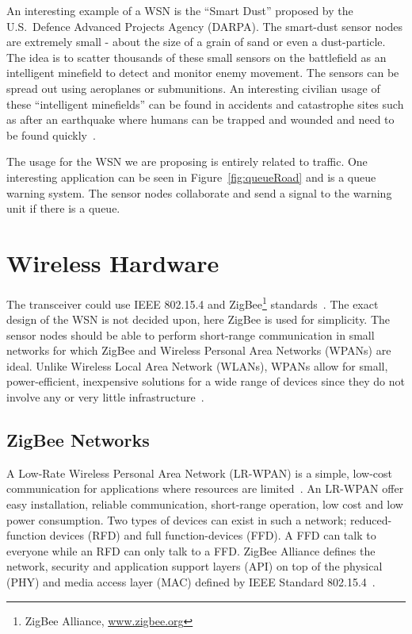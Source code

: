 An interesting example of a WSN is the ``Smart Dust'' proposed by the U.S.~Defence Advanced Projects Agency (DARPA). The smart-dust sensor nodes are extremely small - about the size of a grain of sand or even a dust-particle. The idea is to scatter thousands of these small sensors on the battlefield as an intelligent minefield to detect and monitor enemy movement.  The sensors can be spread out using aeroplanes or submunitions. An interesting civilian usage of these ``intelligent minefields'' can be found in accidents and catastrophe sites such as after an earthquake where humans can be trapped and wounded and need to be found quickly~\cite{runes}.

The usage for the WSN we are proposing is entirely related to traffic. One interesting application can be seen in Figure~\ref{fig:queueRoad} and is a queue warning system. The sensor nodes collaborate and send a signal to the warning unit if there is a queue.

\section{Wireless Hardware}

The transceiver could use IEEE 802.15.4 and ZigBee\footnote{ZigBee Alliance, \url{www.zigbee.org}} standards~\cite{arrigault2007}. The exact design of the WSN is not decided upon, here ZigBee is used for simplicity.
The sensor nodes should be able to perform short-range communication in small networks for which ZigBee and Wireless Personal Area Networks (WPANs) are ideal. Unlike Wireless Local Area Network (WLANs), WPANs allow for small, power-efficient, inexpensive solutions for a wide range of devices since they do not involve any or very little infrastructure~\cite{802.15.4}.

\subsection{ZigBee Networks}

A Low-Rate Wireless Personal Area Network (LR-WPAN) is a simple, low-cost communication for applications where resources are limited~\cite{802.15.4}. An LR-WPAN offer easy installation, reliable communication, short-range operation, low cost and low power consumption. Two types of devices can exist in such a network; reduced-function devices (RFD) and full function-devices (FFD). A FFD can talk to everyone while an RFD can only talk to a FFD. ZigBee Alliance defines the network, security and application support layers (API) on top of the physical (PHY) and media access layer (MAC) defined by IEEE Standard 802.15.4~\cite{zigbee,802.15.4}.

